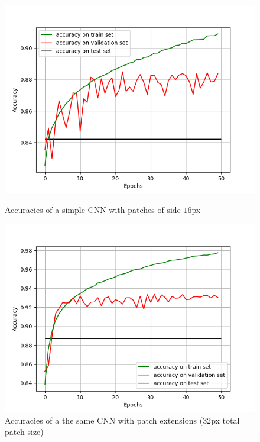 \documentclass[10pt,conference,compsocconf]{IEEEtran}
\begin{document}
\begin{figure}[h]
	\centering
	\begin{minipage}[b]{0.48\linewidth}
		\includegraphics[width=\textwidth]{CNN_with_border_0.png}
		\captionsetup{aboveskip=0.35cm,justification=centering, margin=0.1cm, labelfont=footnotesize, textfont=footnotesize}
		\caption{Accuracies of a simple CNN with patches of side $16$px}
		\label{fig:noExtensions}
	\end{minipage}
	\hspace{0.05cm}
	\begin{minipage}[b]{0.48\linewidth}
		\includegraphics[width=\textwidth]{CNN_with_border_16.png}
		\captionsetup{aboveskip=0.1cm,justification=centering, margin=0.1cm, labelfont=footnotesize, textfont=footnotesize}
		\caption{Accuracies of a the same CNN with patch extensions ($32$px total patch size)}
		\label{fig:extensions}
	\end{minipage}
\end{figure}
\end{document}
